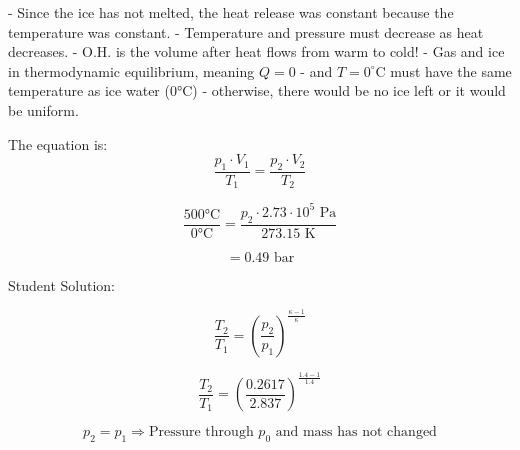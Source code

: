 - Since the ice has not melted, the heat release was constant because the temperature was constant.
- Temperature and pressure must decrease as heat decreases.
- O.H. is the volume after heat flows from warm to cold!
- Gas and ice in thermodynamic equilibrium, meaning \( Q = 0 \)
- and \( T = 0^\circ \text{C} \) must have the same temperature as ice water (0°C)
- otherwise, there would be no ice left or it would be uniform.

The equation is:
\[
\frac{p_1 \cdot V_1}{T_1} = \frac{p_2 \cdot V_2}{T_2}
\]

\[
\frac{500 \text{°C}}{0 \text{°C}} = \frac{p_2 \cdot 2.73 \cdot 10^5 \text{ Pa}}{273.15 \text{ K}}
\]

\[
= 0.49 \text{ bar}
\]

Student Solution:

\[
\frac{T_2}{T_1} = \left( \frac{p_2}{p_1} \right)^{\frac{\kappa - 1}{\kappa}}
\]

\[
\frac{T_2}{T_1} = \left( \frac{0.2617}{2.837} \right)^{\frac{1.4 - 1}{1.4}}
\]

\[
p_2 = p_1 \Rightarrow \text{Pressure through } p_0 \text{ and mass has not changed}
\]